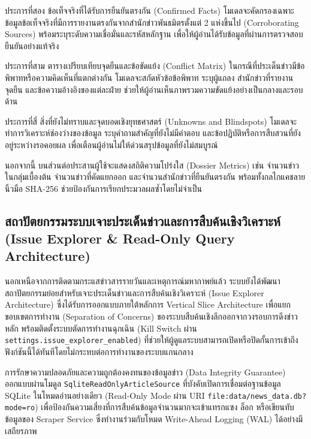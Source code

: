 ประการที่สอง ข้อเท็จจริงที่ได้รับการยืนยันตรงกัน (Confirmed Facts) โมเดลจะคัดกรองเฉพาะข้อมูลข้อเท็จจริงที่มีการรายงานตรงกันจากสำนักข่าวพันธมิตรตั้งแต่ 2 แห่งขึ้นไป (Corroborating Sources) พร้อมระบุระดับความเชื่อมั่นและรหัสหลักฐาน เพื่อให้ผู้อ่านได้รับข้อมูลที่ผ่านการตรวจสอบยืนยันอย่างแท้จริง

ประการที่สาม ตารางเปรียบเทียบจุดยืนและข้อขัดแย้ง (Conflict Matrix) ในกรณีที่ประเด็นข่าวมีข้อพิพาทหรือความคิดเห็นที่แตกต่างกัน โมเดลจะสกัดหัวข้อข้อพิพาท ระบุผู้แถลง สำนักข่าวที่รายงาน จุดยืน และข้อความอ้างอิงของแต่ละฝ่าย ช่วยให้ผู้อ่านเห็นภาพรวมความขัดแย้งอย่างเป็นกลางและรอบด้าน

ประการที่สี่ สิ่งที่ยังไม่ทราบและจุดบอดเชิงยุทธศาสตร์ (Unknowns and Blindspots) โมเดลจะทำการวิเคราะห์ช่องว่างของข้อมูล ระบุคำถามสำคัญที่ยังไม่มีคำตอบ และข้อปฏิบัติหรือการสืบสวนที่ยังอยู่ระหว่างรอคอยผล เพื่อเตือนผู้อ่านไม่ให้ด่วนสรุปข้อมูลที่ยังไม่สมบูรณ์

นอกจากนี้ บนส่วนต่อประสานผู้ใช้จะแสดงสถิติความโปร่งใส (Dossier Metrics) เช่น จำนวนข่าวในกลุ่มเบื้องต้น จำนวนข่าวที่คัดแยกออก และจำนวนสำนักข่าวที่ยืนยันตรงกัน พร้อมทั้งกลไกแคชลายนิ้วมือ SHA-256 ช่วยป้องกันการเรียกประมวลผลซ้ำโดยไม่จำเป็น


\subsection{สถาปัตยกรรมระบบเจาะประเด็นข่าวและการสืบค้นเชิงวิเคราะห์ (Issue Explorer \& Read-Only Query Architecture)}

นอกเหนือจากการติดตามกระแสข่าวสารรายวันและเหตุการณ์มหากาพย์แล้ว ระบบยังได้พัฒนาสถาปัตยกรรมย่อยสำหรับเจาะประเด็นข่าวและการสืบค้นเชิงวิเคราะห์ (Issue Explorer Architecture) ซึ่งได้รับการออกแบบภายใต้หลักการ Vertical Slice Architecture เพื่อแยกขอบเขตการทำงาน (Separation of Concerns) ของระบบสืบค้นเชิงลึกออกจากวงรอบการดึงข่าวหลัก พร้อมติดตั้งระบบตัดการทำงานฉุกเฉิน (Kill Switch ผ่าน \texttt{settings.issue\_explorer\_enabled}) ที่ช่วยให้ผู้ดูแลระบบสามารถเปิดหรือปิดกั้นการเข้าถึงฟังก์ชันนี้ได้ทันทีโดยไม่กระทบต่อการทำงานของระบบแกนกลาง

การรักษาความปลอดภัยและความถูกต้องคงทนของข้อมูลข่าว (Data Integrity Guarantee) ออกแบบผ่านโมดูล \texttt{SqliteReadOnlyArticleSource} ที่บังคับเปิดการเชื่อมต่อฐานข้อมูล SQLite ในโหมดอ่านอย่างเดียว (Read-Only Mode ผ่าน URI \texttt{file:data/news\_data.db?mode=ro}) เพื่อป้องกันความเสี่ยงที่การสืบค้นข้อมูลจำนวนมากจะเข้าแทรกแซง ล็อก หรือเขียนทับข้อมูลของ Scraper Service ซึ่งทำงานร่วมกับโหมด Write-Ahead Logging (WAL) ได้อย่างมีเสถียรภาพ

